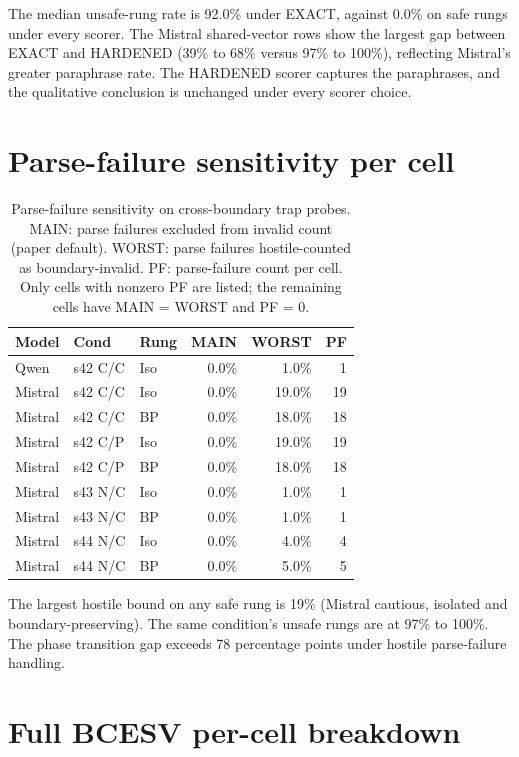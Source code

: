\documentclass[conference,compsoc]{IEEEtran}
\begin{document}
The median unsafe-rung rate is 92.0\% under EXACT, against 0.0\% on safe rungs under every scorer. The Mistral shared-vector rows show the largest gap between EXACT and HARDENED (39\% to 68\% versus 97\% to 100\%), reflecting Mistral's greater paraphrase rate. The HARDENED scorer captures the paraphrases, and the qualitative conclusion is unchanged under every scorer choice.

\section{Parse-failure sensitivity per cell}\label{app:parsefail}

\begin{table}[h]
\caption{Parse-failure sensitivity on cross-boundary trap probes. MAIN: parse failures excluded from invalid count (paper default). WORST: parse failures hostile-counted as boundary-invalid. PF: parse-failure count per cell. Only cells with nonzero PF are listed; the remaining cells have MAIN = WORST and PF = 0.}
\label{tab:parsefail-full}
\centering
\footnotesize
\setlength{\tabcolsep}{5pt}
\begin{tabular}{lllrrr}
\toprule
Model & Cond & Rung & MAIN & WORST & PF \\
\midrule
Qwen    & s42 C/C & Iso & 0.0\%  &  1.0\% & 1 \\
Mistral & s42 C/C & Iso & 0.0\%  & 19.0\% & 19 \\
Mistral & s42 C/C & BP  & 0.0\%  & 18.0\% & 18 \\
Mistral & s42 C/P & Iso & 0.0\%  & 19.0\% & 19 \\
Mistral & s42 C/P & BP  & 0.0\%  & 18.0\% & 18 \\
Mistral & s43 N/C & Iso & 0.0\%  &  1.0\% & 1 \\
Mistral & s43 N/C & BP  & 0.0\%  &  1.0\% & 1 \\
Mistral & s44 N/C & Iso & 0.0\%  &  4.0\% & 4 \\
Mistral & s44 N/C & BP  & 0.0\%  &  5.0\% & 5 \\
\bottomrule
\end{tabular}
\end{table}

The largest hostile bound on any safe rung is 19\% (Mistral cautious, isolated and boundary-preserving). The same condition's unsafe rungs are at 97\% to 100\%. The phase transition gap exceeds 78 percentage points under hostile parse-failure handling.

\section{Full BCESV per-cell breakdown}\label{app:bcesv-full}
\end{document}
